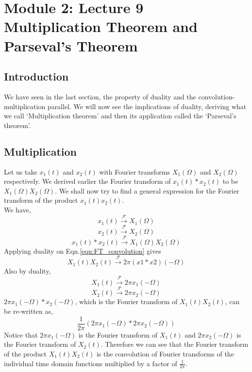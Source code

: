 \section{Module 2: Lecture 9\\Multiplication Theorem and Parseval's Theorem}


\subsection{Introduction}
	We have seen in the last section, the property of duality and the convolution-multiplication parallel. We will now see the implications of duality, deriving what we call ‘Multiplication theorem’ and then its application called the ‘Parseval’s theorem’.

\subsection{Multiplication}
	Let us take $x_1(t)$ and $x_2(t)$ with Fourier transforms $X_1(\Omega)$ and $X_2(\Omega)$ respectively. We derived earlier the Fourier transform of $x_1(t) \ast x_2(t)$ to be $X_1(\Omega)X_2(\Omega)$. We shall now try to find a general expression for the Fourier transform of the product $x_1(t)x_2(t)$.\\
	We have,            
	\begin{equation}
		x_1(t)\xrightarrow{\mathcal{F}} X_1(\Omega)
	\end{equation}
	\begin{equation}
		x_2(t) \xrightarrow{\mathcal{F}} X_2(\Omega)
	\end{equation}
	\begin{equation}\label{eqn:FT_convolution}
		x_1(t) \ast x_2(t)\xrightarrow{\mathcal{F}} X_1(\Omega)X_2(\Omega)
	\end{equation}
	Applying duality on Eqn.\ref{eqn:FT_convolution} gives
	\begin{equation*}
		X_1(t)X_2(t)
		\xrightarrow{\mathcal{F}}
		2\pi (x1 \ast x2)(-\Omega)
	\end{equation*}
	Also by duality,
	\begin{equation*}
		X_1(t)
		\xrightarrow{\mathcal{F}}
		2 \pi x_1(-\Omega)
	\end{equation*}
	\begin{equation*}
		X_2(t)
		\xrightarrow{\mathcal{F}}
		2 \pi x_2(-\Omega)
	\end{equation*}
	$2\pi x_1(-\Omega) \ast x_2(-\Omega)$, which is the Fourier transform of $X_1(t)X_2(t)$, can be re-written as,
	\begin{equation*}
		\frac{1}{2\pi} ( 2\pi x_1(-\Omega) * 2\pi x_2(-\Omega) )
	\end{equation*}
	Notice that $2\pi x_1(-\Omega)$ is the Fourier transform of $X_1(t)$ and $2\pi x_2(-\Omega)$ is the Fourier transform of $X_2(t)$.
	Therefore we can see that the Fourier transform of the product $X_1(t)X_2(t)$ is the convolution of Fourier transforms of the individual time domain functions multiplied by a factor of $\frac{1}{2\pi}$.
